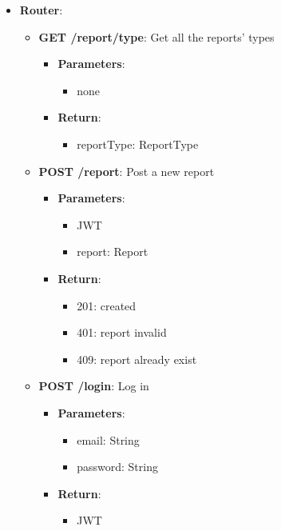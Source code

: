 \documentclass{article}
\begin{document}
\begin{itemize}
	\item \textbf{Router}:
		\begin{itemize}
			\item \textbf{GET /report/type}:
				Get all the reports' types
				\begin{itemize}
					\item \textbf{Parameters}:
						\begin{itemize}
							\item none
						\end{itemize}
					\item \textbf{Return}:
						\begin{itemize}
							\item reportType: \textlangle{}ReportType\textrangle{}
						\end{itemize}
				\end{itemize}
			\item \textbf{POST /report}:
				Post a new report
				\begin{itemize}
					\item \textbf{Parameters}:
						\begin{itemize}
							\item JWT
							\item report: Report
						\end{itemize}
					\item \textbf{Return}:
						\begin{itemize}
							\item 201: created
							\item 401: report invalid
							\item 409: report already exist
						\end{itemize}
				\end{itemize}
			\item \textbf{POST /login}:
				Log in
				\begin{itemize}
					\item \textbf{Parameters}:
						\begin{itemize}
							\item email: String
							\item password: String
						\end{itemize}
					\item \textbf{Return}:
						\begin{itemize}
							\item JWT
						\end{itemize}

\end{itemize}
\end{itemize}
\end{itemize}
\end{document}

